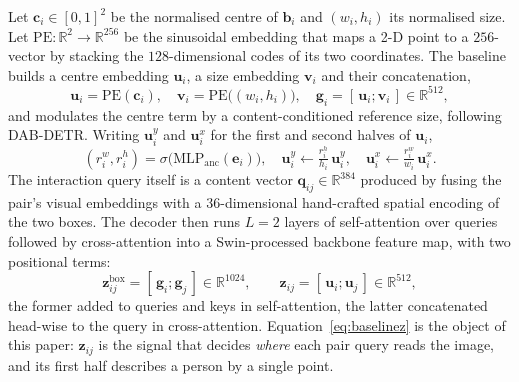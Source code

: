 \documentclass[12pt,a4paper]{article}
\newcommand{\bx}{\mathbf{b}}
\newcommand{\bc}{\mathbf{c}}
\newcommand{\be}{\mathbf{e}}
\newcommand{\bq}{\mathbf{q}}
\newcommand{\bz}{\mathbf{z}}
\newcommand{\PE}{\mathrm{PE}}
\newcommand{\R}{\mathbb{R}}
\begin{document}
Let $\bc_i \in [0,1]^2$ be the normalised centre of $\bx_i$ and
$(w_i, h_i)$ its normalised size. Let $\PE : \R^2 \to \R^{256}$ be the
sinusoidal embedding that maps a 2-D point to a $256$-vector by stacking the
$128$-dimensional codes of its two coordinates. The baseline builds a centre
embedding $\mathbf{u}_i$, a size embedding $\mathbf{v}_i$ and their
concatenation,
\begin{equation}
\mathbf{u}_i = \PE(\bc_i), \quad
\mathbf{v}_i = \PE\big((w_i,h_i)\big), \quad
\mathbf{g}_i = [\,\mathbf{u}_i ; \mathbf{v}_i\,] \in \R^{512},
\end{equation}
and modulates the centre term by a content-conditioned reference size,
following DAB-DETR. Writing $\mathbf{u}^{y}_i$ and $\mathbf{u}^{x}_i$ for the
first and second halves of $\mathbf{u}_i$,
\begin{equation}
(r^w_i, r^h_i) = \sigma\big(\mathrm{MLP}_{\text{anc}}(\be_i)\big), \quad
\mathbf{u}^{y}_i \leftarrow \tfrac{r^h_i}{h_i}\,\mathbf{u}^{y}_i, \quad
\mathbf{u}^{x}_i \leftarrow \tfrac{r^w_i}{w_i}\,\mathbf{u}^{x}_i .
\label{eq:boxmod}
\end{equation}
The interaction query itself is a content vector
$\bq_{ij} \in \R^{384}$ produced by fusing the pair's visual embeddings with a
$36$-dimensional hand-crafted spatial encoding of the two boxes. The decoder
then runs $L=2$ layers of self-attention over queries followed by
cross-attention into a Swin-processed backbone feature map, with two positional
terms:
\begin{equation}
\bz^{\text{box}}_{ij} = [\,\mathbf{g}_i ; \mathbf{g}_j\,] \in \R^{1024},
\qquad
\bz_{ij} = [\,\mathbf{u}_i ; \mathbf{u}_j\,] \in \R^{512},
\label{eq:baselinez}
\end{equation}
the former added to queries and keys in self-attention, the latter concatenated
head-wise to the query in cross-attention. Equation~\eqref{eq:baselinez} is the
object of this paper: $\bz_{ij}$ is the signal that decides \emph{where} each
pair query reads the image, and its first half describes a person by a single
point.
\end{document}
